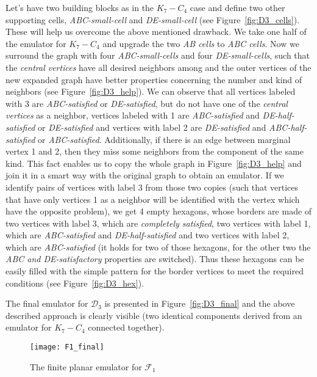 \documentclass[envcountsect,envcountsame]{llncs}
\renewenvironment{accumulate}{}{}
\newcommand{\KK}{\ensuremath{{K}_7 - C_4}\xspace}
\newcommand{\DD}{\ensuremath{\mathcal{D}_3}\xspace}
\newcommand{\FF}{\ensuremath{\mathcal{F}_1}\xspace}
\begin{document}
\begin{accumulate}
Let's have two building blocks as in the \KK case and define two other
supporting cells, \textit{ABC-small-cell} and \textit{DE-small-cell} (see
Figure~\ref{fig:D3_cells}).  These will help us overcome the above
mentioned drawback.  We take one half of the emulator for \KK and upgrade the
two \textit{AB cells} to \textit{ABC cells}.  Now we surround the graph with
four \textit{ABC-small-cells} and four \textit{DE-small-cells}, such that
the \textit{central vertices} have all desired neighbors among 
and the outer vertices of the new expanded graph have better properties
concerning the number and kind of neighbors (see Figure~\ref{fig:D3_help}). 
We can observe that all vertices labeled with 3 are \textit{ABC-satisfied}
or \textit{DE-satisfied}, but do not have one of the \textit{central
vertices} as a neighbor, vertices labeled with 1 are \textit{ABC-satisfied}
and \textit{DE-half-satisfied} or \textit{DE-satisfied} and vertices with
label 2 are \textit{DE-satisfied} and \textit{ABC-half-satisfied} or
\textit{ABC-satisfied}.  Additionally, if there is an edge between marginal
vertex 1 and 2, then they miss some neighbors from the component of the same
kind.  This fact enables us to copy the whole graph in
Figure~\ref{fig:D3_help} and join it in a smart way with the original graph
to obtain an emulator.  If we identify pairs of vertices with label 3 from
those two copies (such that vertices that have only vertices 1 as a neighbor
will be identified with the vertex which have the opposite problem), we get
4 empty hexagons, whose borders are made of two vertices with label 3, which
are \textit{completely satisfied}, two vertices with label 1, which are
\textit{ABC-satisfied} and \textit{DE-half-satisfied} and two vertices with
label 2, which are \textit{ABC-satisfied} (it holds for two of those
hexagons, for the other two the \textit{ABC and DE-satisfactory} properties
are switched).  Thus these hexagons can be easily filled with the simple
pattern for the border vertices to meet the required conditions (see
Figure~\ref{fig:D3_hex}).

The final emulator for \DD is presented in Figure~\ref{fig:D3_final} and the
above described approach is clearly visible (two identical components derived from an emulator for
\KK connected together). 



\begin{figure}[tb]
\texttt{[image: F1\_final]}
\caption{The finite planar emulator for \FF}
\label{fig:F1_final}
\end{figure}


\end{accumulate}
\end{document}

